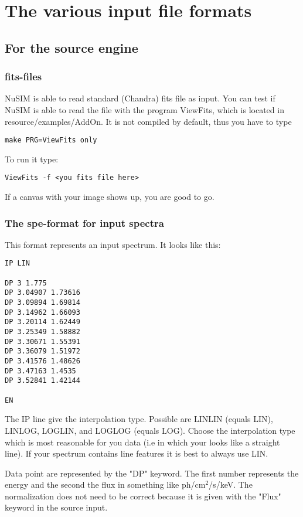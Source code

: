 \chapter{The various input file formats}

\section{For the source engine}

\subsection{fits-files}

NuSIM is able to read standard (Chandra) fits file as input.
You can test if NuSIM is able to read the file with the program ViewFits, which is located in resource/examples/AddOn. It is not compiled by default, thus you have to type
\begin{verbatim}
make PRG=ViewFits only
\end{verbatim}
To run it type:
\begin{verbatim}
ViewFits -f <you fits file here>
\end{verbatim}
If a canvas with your image shows up, you are good to go.

\subsection{The spe-format for input spectra \label{label:spectrumfile}}

This format represents an input spectrum.
It looks like this:
\begin{verbatim}
IP LIN

DP 3 1.775
DP 3.04907 1.73616
DP 3.09894 1.69814
DP 3.14962 1.66093
DP 3.20114 1.62449
DP 3.25349 1.58882
DP 3.30671 1.55391
DP 3.36079 1.51972
DP 3.41576 1.48626
DP 3.47163 1.4535
DP 3.52841 1.42144

EN
\end{verbatim}

The IP line give the interpolation type. Possible are LINLIN (equals LIN), LINLOG, LOGLIN, and LOGLOG (equals LOG). Choose the interpolation type which is most reasonable for you data (i.e in which your looks like a straight line).
If your spectrum contains line features it is best to always use LIN.

Data point are represented by the "DP" keyword.
The first number represents the energy and the second the flux in something like ph/cm$^2$/s/keV.
The normalization does not need to be correct because it is given with the "Flux" keyword in the source input.

